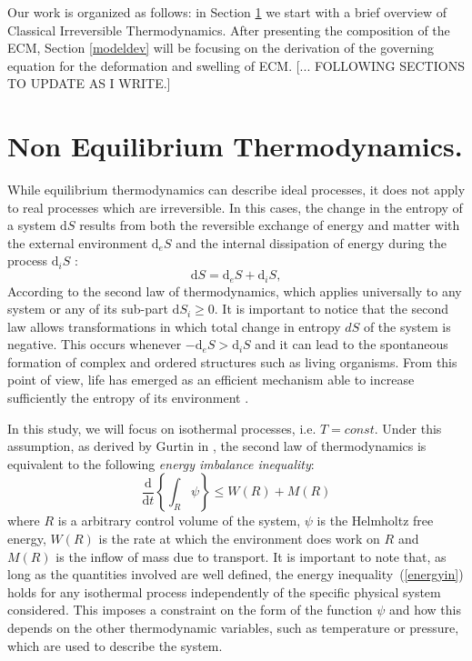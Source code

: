 \documentclass[runningheads]{llncs}
\renewcommand{\d}{\ensuremath{\text{d}}}
\begin{document}
Our work is organized as follows: in Section \ref{secNET} we start with a brief overview of Classical Irreversible Thermodynamics. After presenting the composition of the ECM, Section \ref{modeldev} will be focusing on the derivation of the governing equation for the deformation and swelling of ECM. [... FOLLOWING SECTIONS TO UPDATE AS I WRITE.]

\section{Non Equilibrium Thermodynamics.}
\label{secNET}
While equilibrium thermodynamics can describe ideal processes, it does not apply to real processes which are irreversible. In this cases, the change in the entropy of a system $\d S$ results from both the reversible exchange of energy and matter with the external environment $\d_eS$ and the internal dissipation of energy during the process $\d_iS$ \cite{NET}:
\begin{equation}
\d S = \d_eS + \d_iS, 
\end{equation}
According to the second law of thermodynamics, which applies universally to any system or any of its sub-part $\d S_i\ge 0$. It is important to notice that the second law allows transformations in which total change in entropy $d S$ of the system is negative. This occurs whenever $-\d_e S>\d_i S$ and it can lead to the spontaneous formation of complex and ordered structures such as living organisms. From this point of view, life has emerged as an efficient mechanism able to increase sufficiently the entropy of its environment \cite{JeremyEngland}.  

In this study, we will focus on isothermal processes, i.e. $T=const$. Under this assumption, as derived by Gurtin in \cite{GURTIN}, the second law of thermodynamics is equivalent to the following \textit{energy imbalance inequality}:
\begin{equation}
\frac{\d}{\d t} \left\{\int_R \psi \right\}\leq W(R) + M(R) \label{energyin}
\end{equation}
where $R$ is a arbitrary control volume of the system, $\psi$ is the Helmholtz free energy, $W(R)$ is the rate at which the environment does work on $R$ and $M(R)$ is the inflow of mass due to transport. It is important to note that, as long as the quantities involved are well defined, the energy inequality~(\ref{energyin}) holds for any isothermal process independently of the specific physical system considered. This imposes a constraint on the form of the function $\psi$ and how this depends on the other thermodynamic variables, such as temperature or pressure, which are used to describe the system. 
\end{document}
